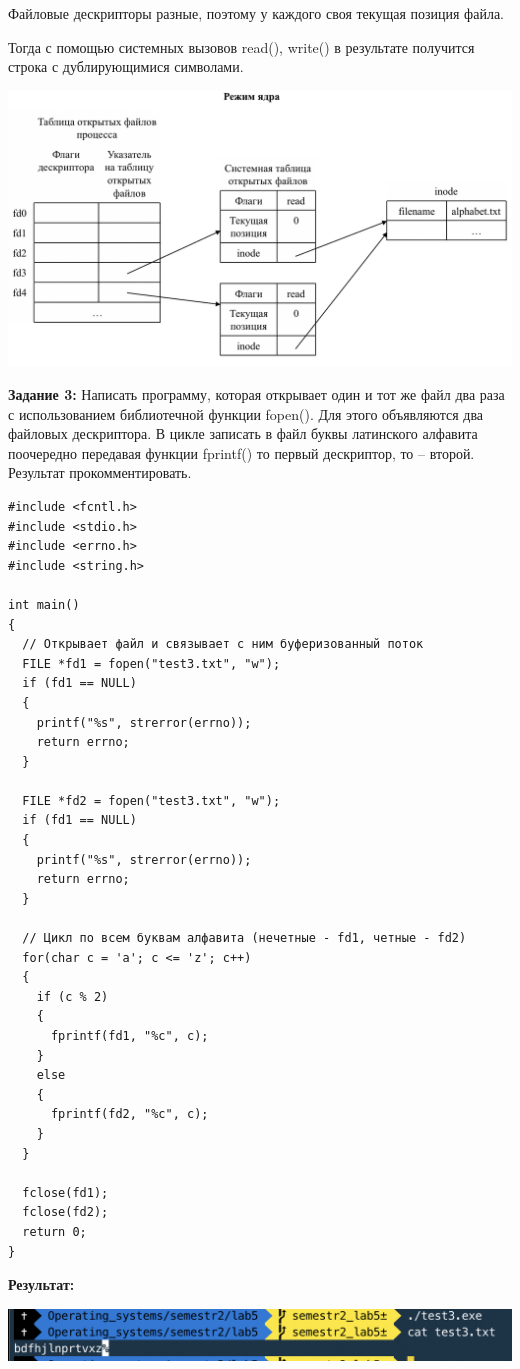 \documentclass[a4paper,14pt]{extreport} %
\begin{document}
Файловые дескрипторы разные, поэтому у каждого своя текущая позиция файла.

Тогда с помощью системных вызовов read(), write() в результате получится строка с дублирующимися символами. 

\includegraphics[scale=0.7]{shema2}

\newpage

\textbf{Задание 3:} Написать программу, которая открывает один и тот же файл два раза с использованием библиотечной функции fopen(). Для этого объявляются два файловых дескриптора. В цикле записать в файл буквы латинского алфавита поочередно передавая функции fprintf() то первый дескриптор, то – второй.
Результат прокомментировать.

\begin{lstlisting}[]
#include <fcntl.h>
#include <stdio.h>
#include <errno.h>
#include <string.h>

int main()
{
  // Открывает файл и связывает с ним буферизованный поток
  FILE *fd1 = fopen("test3.txt", "w");
  if (fd1 == NULL)
  {
    printf("%s", strerror(errno));
    return errno;
  }

  FILE *fd2 = fopen("test3.txt", "w");
  if (fd1 == NULL)
  {
    printf("%s", strerror(errno));
    return errno;
  }

  // Цикл по всем буквам алфавита (нечетные - fd1, четные - fd2)
  for(char c = 'a'; c <= 'z'; c++)
  {
    if (c % 2)
    {
      fprintf(fd1, "%c", c);
    }
    else
    {
      fprintf(fd2, "%c", c);
    }
  }

  fclose(fd1);
  fclose(fd2);
  return 0;
}
\end{lstlisting}

\textbf{Результат:}

\includegraphics[scale=0.9]{3}
\end{document}
